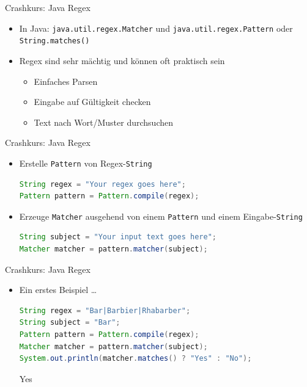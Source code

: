 \documentclass[18pt]{beamer}
\begin{document}
\begin{frame}{Crashkurs: Java Regex}
    \begin{itemize}
        \item In Java: \texttt{java.util.regex.Matcher} und \texttt{java.util.regex.Pattern} oder \texttt{String.matches()}
        \item Regex sind sehr mächtig und können oft praktisch sein
        \begin{itemize}
            \item Einfaches Parsen
            \item Eingabe auf Gültigkeit checken
            \item Text nach Wort/Muster durchsuchen
        \end{itemize}
    \end{itemize}

\end{frame}



\begin{frame}[fragile]{Crashkurs: Java Regex}
    \begin{itemize}
        \item Erstelle \texttt{Pattern} von Regex-\texttt{String}
    \begin{lstlisting}[language=Java,basicstyle=\scriptsize]
String regex = "Your regex goes here";
Pattern pattern = Pattern.compile(regex);
    \end{lstlisting}
        \vspace{.2in}
        \item Erzeuge \texttt{Matcher} ausgehend von einem \texttt{Pattern} und einem Eingabe-\texttt{String}

        \begin{lstlisting}[language=Java,basicstyle=\scriptsize]
String subject = "Your input text goes here";
Matcher matcher = pattern.matcher(subject);
        \end{lstlisting}

    \end{itemize}

\end{frame}

\begin{frame}[fragile]{Crashkurs: Java Regex}
    \begin{itemize}
        \item Ein erstes Beispiel \dots
        \begin{lstlisting}[language=Java,basicstyle=\scriptsize]
String regex = "Bar|Barbier|Rhabarber";
String subject = "Bar";
Pattern pattern = Pattern.compile(regex);
Matcher matcher = pattern.matcher(subject);
System.out.println(matcher.matches() ? "Yes" : "No");
        \end{lstlisting}
        \begin{exampleblock}{}
Yes
        \end{exampleblock}

    \end{itemize}
\end{frame}
\end{document}
